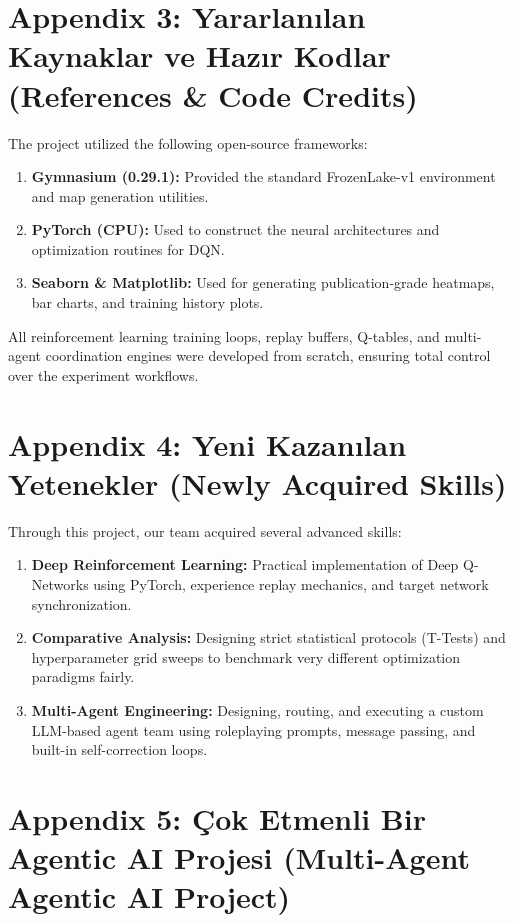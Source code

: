 \documentclass[conference]{IEEEtran}
\begin{document}
\section*{Appendix 3: Yararlanılan Kaynaklar ve Hazır Kodlar (References \& Code Credits)}
The project utilized the following open-source frameworks:
\begin{enumerate}
\item \textbf{Gymnasium (0.29.1):} Provided the standard FrozenLake-v1 environment and map generation utilities.
\item \textbf{PyTorch (CPU):} Used to construct the neural architectures and optimization routines for DQN.
\item \textbf{Seaborn \& Matplotlib:} Used for generating publication-grade heatmaps, bar charts, and training history plots.
\end{enumerate}
All reinforcement learning training loops, replay buffers, Q-tables, and multi-agent coordination engines were developed from scratch, ensuring total control over the experiment workflows.

\section*{Appendix 4: Yeni Kazanılan Yetenekler (Newly Acquired Skills)}
Through this project, our team acquired several advanced skills:
\begin{enumerate}
\item \textbf{Deep Reinforcement Learning:} Practical implementation of Deep Q-Networks using PyTorch, experience replay mechanics, and target network synchronization.
\item \textbf{Comparative Analysis:} Designing strict statistical protocols (T-Tests) and hyperparameter grid sweeps to benchmark very different optimization paradigms fairly.
\item \textbf{Multi-Agent Engineering:} Designing, routing, and executing a custom LLM-based agent team using roleplaying prompts, message passing, and built-in self-correction loops.
\end{enumerate}

\section*{Appendix 5: Çok Etmenli Bir Agentic AI Projesi (Multi-Agent Agentic AI Project)}
\end{document}
